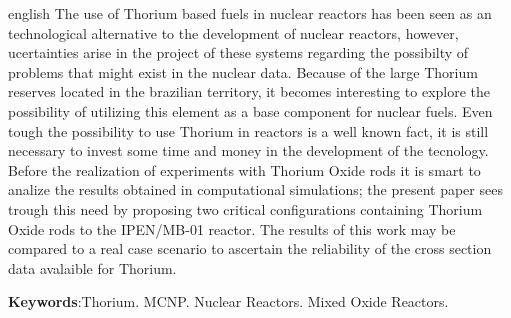 \documentclass[
	12pt,				%
	openany,			%
	twoside,			%
	a4paper,			%
	english,			%
	french,				%
	spanish,			%
	brazil				%
	]{abntex2}
\begin{document}
\begin{resumo}[Abstract]
 \begin{otherlanguage*}{english}
   The use of Thorium based fuels in nuclear reactors has been seen as an technological alternative to the development of nuclear reactors, however, ucertainties arise in the project of these systems regarding the possibilty of problems that might exist in the nuclear data. Because of the large Thorium reserves located in the brazilian territory, it becomes interesting to explore the possibility of utilizing this element as a base component for nuclear fuels. Even tough the possibility to use Thorium in reactors is a well known fact, it is still necessary to invest some time and money in the development of the tecnology. Before the realization of experiments with Thorium Oxide rods it is smart to analize the results obtained in computational simulations; the present paper sees trough this need by proposing two critical configurations containing Thorium Oxide rods to the IPEN/MB-01 reactor. The results of this work may be compared to a real case scenario to ascertain the reliability of the cross section data avalaible for Thorium.

   \vspace{\onelineskip}
 
   \noindent 
   \textbf{Keywords}:Thorium. MCNP. Nuclear Reactors. Mixed Oxide Reactors.
 \end{otherlanguage*}
\end{resumo}

\listoffigures*
\cleardoublepage

\listoftables*
\cleardoublepage
\end{document}
